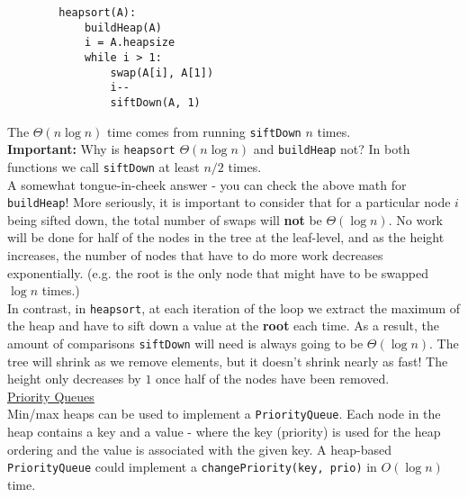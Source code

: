 \documentclass[12pt, fleqn]{general}
\begin{document}
\begin{multicols*}{2}
    \begin{framed}
    \begingroup
    \makeatletter
    \@totalleftmargin=-1.5cm
    \begin{verbatim}
        heapsort(A):
            buildHeap(A)
            i = A.heapsize
            while i > 1:
                swap(A[i], A[1])
                i--
                siftDown(A, 1)
    \end{verbatim}
    \makeatother
    \endgroup
    \end{framed}

    The $\Theta(n\log n)$ time comes from running \texttt{siftDown} $n$ times.\\
    
    \textbf{Important: } Why is \texttt{heapsort} $\Theta(n\log n)$ and \texttt{buildHeap} not? In both functions we call \texttt{siftDown} at least $n/2$ times.\\

    A somewhat tongue-in-cheek answer - you can check the above math for \texttt{buildHeap}! More seriously, it is important to consider that for a particular node $i$ being sifted down, the total number of swaps will \textbf{not} be $\Theta(\log n)$. No work will be done for half of the nodes in the tree at the leaf-level, and as the height increases, the number of nodes that have to do more work decreases exponentially. (e.g. the root is the only node that might have to be swapped $\log n$
    times.)\\

    In contrast, in \texttt{heapsort}, at each iteration of the loop we extract the maximum of the heap and have to sift down a value at the \textbf{root} each time. As a result, the amount of comparisons \texttt{siftDown} will need is always going to be $\Theta(\log n)$. The tree will shrink as we remove elements, but it doesn't shrink nearly as fast! The height only decreases by $1$ once half of the nodes have been removed. \\

    \underline{Priority Queues}\\

    Min/max heaps can be used to implement a \texttt{PriorityQueue}. Each node in the heap contains a key and a value - where the key (priority) is used for the heap ordering and the value is associated with the given key. A heap-based \texttt{PriorityQueue} could implement a \texttt{changePriority(key, prio)} in $O(\log n)$ time.\\
    

\end{multicols*}
\end{document}
